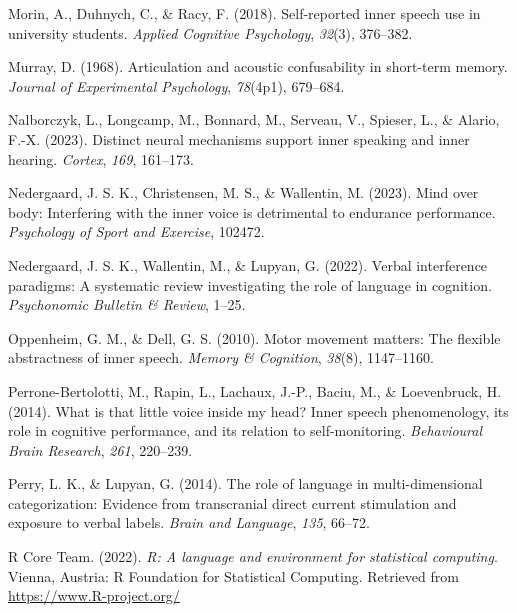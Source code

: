 \documentclass[
  man,a4paper,floatsintext]{apa6}
\newlength{\cslhangindent}
\newlength{\cslentryspacingunit} %
\newenvironment{CSLReferences}[2] %
 {%
  \setlength{\parindent}{0pt}
  \ifodd #1
  \let\oldpar\par
  \def\par{\hangindent=\cslhangindent\oldpar}
  \fi
  \setlength{\parskip}{#2\cslentryspacingunit}
 }%
 {}
\begin{document}
\begin{CSLReferences}{1}{0}
\leavevmode{}%
Morin, A., Duhnych, C., \& Racy, F. (2018). Self-reported inner speech use in university students. \emph{Applied Cognitive Psychology}, \emph{32}(3), 376--382.

\leavevmode{}%
Murray, D. (1968). Articulation and acoustic confusability in short-term memory. \emph{Journal of Experimental Psychology}, \emph{78}(4p1), 679--684.

\leavevmode{}%
Nalborczyk, L., Longcamp, M., Bonnard, M., Serveau, V., Spieser, L., \& Alario, F.-X. (2023). Distinct neural mechanisms support inner speaking and inner hearing. \emph{Cortex}, \emph{169}, 161--173.

\leavevmode{}%
Nedergaard, J. S. K., Christensen, M. S., \& Wallentin, M. (2023). Mind over body: Interfering with the inner voice is detrimental to endurance performance. \emph{Psychology of Sport and Exercise}, 102472.

\leavevmode{}%
Nedergaard, J. S. K., Wallentin, M., \& Lupyan, G. (2022). Verbal interference paradigms: A systematic review investigating the role of language in cognition. \emph{Psychonomic Bulletin \& Review}, 1--25.

\leavevmode{}%
Oppenheim, G. M., \& Dell, G. S. (2010). Motor movement matters: The flexible abstractness of inner speech. \emph{Memory \& Cognition}, \emph{38}(8), 1147--1160.

\leavevmode{}%
Perrone-Bertolotti, M., Rapin, L., Lachaux, J.-P., Baciu, M., \& Loevenbruck, H. (2014). What is that little voice inside my head? Inner speech phenomenology, its role in cognitive performance, and its relation to self-monitoring. \emph{Behavioural Brain Research}, \emph{261}, 220--239.

\leavevmode{}%
Perry, L. K., \& Lupyan, G. (2014). The role of language in multi-dimensional categorization: Evidence from transcranial direct current stimulation and exposure to verbal labels. \emph{Brain and Language}, \emph{135}, 66--72.

\leavevmode{}%
R Core Team. (2022). \emph{R: A language and environment for statistical computing}. Vienna, Austria: R Foundation for Statistical Computing. Retrieved from \url{https://www.R-project.org/}


\end{CSLReferences}
\end{document}
